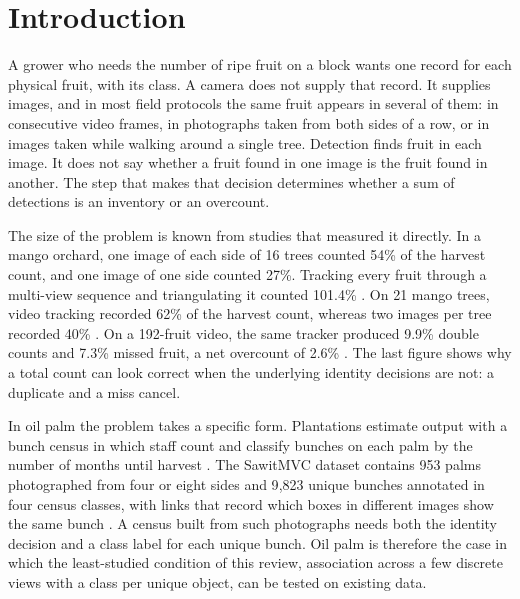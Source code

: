 \section{Introduction}\label{sec:intro}

A grower who needs the number of ripe fruit on a block wants one record for each physical fruit, with its class. A camera does not supply that record. It supplies images, and in most field protocols the same fruit appears in several of them: in consecutive video frames, in photographs taken from both sides of a row, or in images taken while walking around a single tree. Detection finds fruit in each image. It does not say whether a fruit found in one image is the fruit found in another. The step that makes that decision determines whether a sum of detections is an inventory or an overcount.

The size of the problem is known from studies that measured it directly. In a mango orchard, one image of each side of 16 trees counted 54\% of the harvest count, and one image of one side counted 27\%. Tracking every fruit through a multi-view sequence and triangulating it counted 101.4\% \citep{stein2016image}. On 21 mango trees, video tracking recorded 62\% of the harvest count, whereas two images per tree recorded 40\% \citep{wang2019mango}. On a 192-fruit video, the same tracker produced 9.9\% double counts and 7.3\% missed fruit, a net overcount of 2.6\% \citep{wang2019mango}. The last figure shows why a total count can look correct when the underlying identity decisions are not: a duplicate and a miss cancel.

In oil palm the problem takes a specific form. Plantations estimate output with a bunch census in which staff count and classify bunches on each palm by the number of months until harvest \citep{indriani2026sawitmvc}. The SawitMVC dataset contains 953 palms photographed from four or eight sides and 9{,}823 unique bunches annotated in four census classes, with links that record which boxes in different images show the same bunch \citep{indriani2026sawitmvc}. A census built from such photographs needs both the identity decision and a class label for each unique bunch. Oil palm is therefore the case in which the least-studied condition of this review, association across a few discrete views with a class per unique object, can be tested on existing data.

